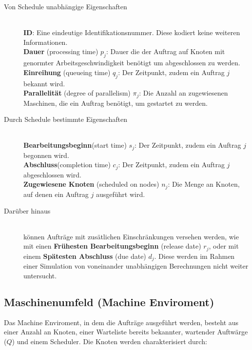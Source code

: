 \begin{description}
\item[Von Schedule unabhängige Eigenschaften] \hfil \\
\textbf{ID}: Eine eindeutige Identifikationsnummer. Diese kodiert keine weiteren Informationen.\\
\textbf{Dauer} (processing time) $p_j$: Dauer die der Auftrag auf Knoten mit genormter Arbeitsgeschwindigkeit benötigt um abgeschlossen zu werden.\\
\textbf{Einreihung} (queueing time) $q_j$: Der Zeitpunkt, zudem ein Auftrag $j$ bekannt wird.\\
\textbf{Parallelität} (degree of parallelism) $\pi_j$: Die Anzahl an zugewiesenen Maschinen, die ein Auftrag benötigt, um gestartet zu werden.\\
\item[Durch Schedule bestimmte Eigenschaften]\hfill \\ 
\textbf{Bearbeitungsbeginn}(start time) $s_j$: Der Zeitpunkt, zudem ein Auftrag $j$ begonnen wird. \\
\textbf{Abschluss}(completion time) $c_j$: Der Zeitpunkt, zudem ein Auftrag $j$ abgeschlossen wird.\\
\textbf{Zugewiesene Knoten} (scheduled on nodes) $n_j$: Die Menge an Knoten, auf denen ein Auftrag $j$ ausgeführt wird.\\

\item[Darüber hinaus] \hfil \\
können Aufträge mit zusätlichen Einschränkungen versehen werden, wie mit einen \textbf{Frühesten Bearbeitungsbeginn} (release date) $r_j$, oder mit einem \textbf{Spätesten Abschluss} (due date) $d_j$. Diese werden im Rahmen einer Simulation von voneinander unabhängigen Berechnungen nicht weiter untersucht.
\end{description}

\subsection{Maschinenumfeld (Machine Enviroment)}
Das Machine Enviroment, in dem die Aufträge ausgeführt werden, besteht aus einer Anzahl an Knoten, einer Warteliste bereits bekannter, wartender Auftwärge ($Q$) und einem Scheduler. Die Knoten werden charakterisiert durch:

